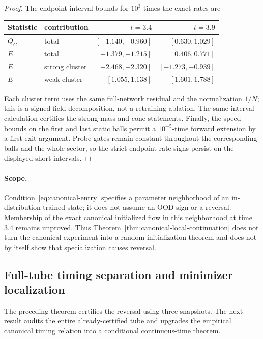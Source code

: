 \documentclass[10pt]{article}
\theoremstyle{remark}\newtheorem{remark}[theorem]{Remark}
\begin{document}
\begin{proof}
The endpoint interval bounds for $10^3$ times the exact rates are
\begin{center}
\begin{tabular}{llrr}
\toprule
Statistic & contribution & $t=3.4$ & $t=3.9$\\
\midrule
$Q_G$ & total & $[-1.140,-0.960]$ & $[0.630,1.029]$\\
$\dot E$ & total & $[-1.379,-1.215]$ & $[0.406,0.771]$\\
$\dot E$ & strong cluster & $[-2.468,-2.320]$ & $[-1.273,-0.939]$\\
$\dot E$ & weak cluster & $[1.055,1.138]$ & $[1.601,1.788]$\\
\bottomrule
\end{tabular}
\end{center}
Each cluster term uses the same full-network residual and the normalization
$1/N$; this is a signed field decomposition, not a retraining ablation.
The same interval calculation certifies the strong mass and cone statements.
Finally, the speed bounds on the first and last static balls permit a
$10^{-5}$-time forward extension by a first-exit argument. Probe gates remain
constant throughout the corresponding balls and the whole sector, so the
strict endpoint-rate signs persist on the displayed short intervals.
\end{proof}

\paragraph{Scope.}
Condition~\eqref{eq:canonical-entry} specifies a parameter neighborhood of an
in-distribution trained state; it does not assume an OOD sign or a reversal.
Membership of the exact canonical initialized flow in this neighborhood at
time $3.4$ remains unproved. Thus Theorem~\ref{thm:canonical-local-continuation}
does not turn the canonical experiment into a random-initialization theorem
and does not by itself show that specialization causes reversal.

\subsection{Full-tube timing separation and minimizer localization}

The preceding theorem certifies the reversal using three snapshots. The next
result audits the entire already-certified tube and upgrades the empirical
canonical timing relation into a conditional continuous-time theorem.
\end{document}
